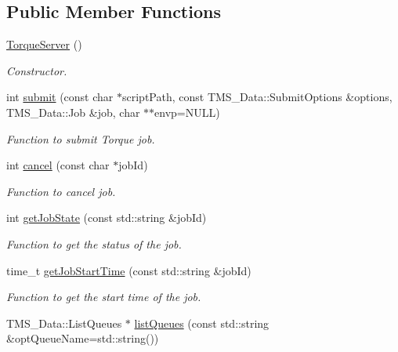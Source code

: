 \subsection*{Public Member Functions}
\begin{DoxyCompactItemize}
\item 
\hypertarget{classTorqueServer_a1537f6573e0996608ea317264ecb02e9}{
\hyperlink{classTorqueServer_a1537f6573e0996608ea317264ecb02e9}{TorqueServer} ()}
\label{classTorqueServer_a1537f6573e0996608ea317264ecb02e9}

\begin{DoxyCompactList}\small\item\em Constructor. \item\end{DoxyCompactList}\item 
int \hyperlink{classTorqueServer_aed03b8755d1959b3a2218abbf4c15b45}{submit} (const char $\ast$scriptPath, const TMS\_\-Data::SubmitOptions \&options, TMS\_\-Data::Job \&job, char $\ast$$\ast$envp=NULL)
\begin{DoxyCompactList}\small\item\em Function to submit Torque job. \item\end{DoxyCompactList}\item 
int \hyperlink{classTorqueServer_a18f3c5c500957a5a14f64f3c34252ae5}{cancel} (const char $\ast$jobId)
\begin{DoxyCompactList}\small\item\em Function to cancel job. \item\end{DoxyCompactList}\item 
int \hyperlink{classTorqueServer_ab86efdba2c40900e858ebf9f687ad05b}{getJobState} (const std::string \&jobId)
\begin{DoxyCompactList}\small\item\em Function to get the status of the job. \item\end{DoxyCompactList}\item 
time\_\-t \hyperlink{classTorqueServer_accebe9545525e72a67d3c684665c9264}{getJobStartTime} (const std::string \&jobId)
\begin{DoxyCompactList}\small\item\em Function to get the start time of the job. \item\end{DoxyCompactList}\item 
TMS\_\-Data::ListQueues $\ast$ \hyperlink{classTorqueServer_a63240dcd85082bb88ee157a8da8f6a04}{listQueues} (const std::string \&optQueueName=std::string())
$$
\end{DoxyCompactItemize}
